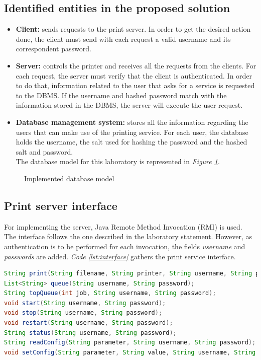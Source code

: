 \subsection{Identified entities in the proposed solution}
\begin{itemize}
	\item \textbf{Client:} sends requests to the print server. In order to get the desired action done, the client must send with each request a valid username and its correspondent password.
	\item \textbf{Server:} controls the printer and receives all the requests from the clients. For each request, the server must verify that the client is authenticated. In order to do that, information related to the user that asks for a service is requested to the DBMS. If the username and hashed password match with the information stored in the DBMS, the server will execute the user request.
	\item \textbf{Database management system:} stores all the information regarding the users that can make use of the printing service. For each user, the database holds the username, the salt used for hashing the password and the hashed salt and password.\\
		The database model for this laboratory is represented in \textit{Figure \ref{fig:dbmodel}}.
\end{itemize}
\begin{figure}[hb]
	\centering	
	
	\caption{Implemented database model}
	\label{fig:dbmodel}
\end{figure}
\subsection{Print server interface}
For implementing the server, Java Remote Method Invocation (RMI) is used.\\
The interface follows the one described in the laboratory statement. However, as authentication is to be performed for each invocation, the fields \textit{username} and \textit{passwords} are added. \textit{Code \ref{lst:interface}} gathers the print service interface. 
\begin{lstlisting}[language=Java, caption=Print service interface, basicstyle=\scriptsize, label={lst:interface}]
String print(String filename, String printer, String username, String password);
List<String> queue(String username, String password);
String topQueue(int job, String username, String password);
void start(String username, String password);
void stop(String username, String password);
void restart(String username, String password);
String status(String username, String password);
String readConfig(String parameter, String username, String password);
void setConfig(String parameter, String value, String username, String password);
\end{lstlisting}
